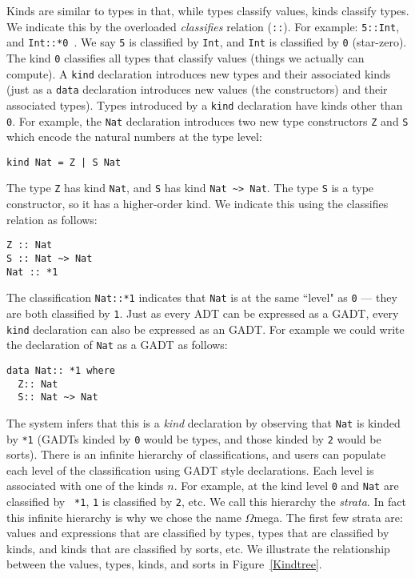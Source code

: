\documentclass[11pt,twoside]{article}
\newcommand{\om}{$\Omega$mega}
\begin{document}
Kinds are similar to types in that, while types classify values, kinds classify
types. We indicate this by the overloaded {\em classifies} relation ({\tt ::}). For example:
{\tt 5::Int}, and {\tt Int::*0 }. We say {\tt 5} is classified by {\tt Int}, and {\tt Int}
is classified by {\tt *0} (star-zero). The kind {\tt *0} classifies all
types that classify values (things we actually can compute). A {\tt kind}
declaration introduces new types and their associated kinds (just as a {\tt data}
declaration introduces new values (the constructors) and their associated types).
Types introduced by a {\tt kind} declaration have kinds other than {\tt *0}.
For example, the {\tt Nat} declaration introduces two new
type constructors {\tt Z} and {\tt S} which encode the natural
numbers at the type level:
\begin{verbatim}
kind Nat = Z | S Nat
\end{verbatim}
The type {\tt Z} has kind {\tt Nat}, and {\tt S} has kind {\tt Nat \verb+~+>
Nat}. The type {\tt S} is a type constructor, so it has a higher-order kind. We
indicate this using the classifies relation as follows:
\begin{verbatim}
Z :: Nat
S :: Nat ~> Nat
Nat :: *1
\end{verbatim}

The classification {\tt Nat::*1} indicates that {\tt Nat} is at the same
``level" as {\tt *0} --- they are both classified by {\tt *1}.
Just as every ADT can be expressed as a GADT, every {\tt kind}
declaration can also be expressed as an GADT. For example we could write
the declaration of {\tt Nat} as a GADT as follows:
\begin{verbatim}
data Nat:: *1 where
  Z:: Nat
  S:: Nat ~> Nat
\end{verbatim}

The system infers that this is a {\em kind} declaration by observing
that {\tt Nat} is kinded by \verb+*1+ (GADTs kinded by {\tt *0} would
be types, and those kinded by {\tt *2} would be sorts).
There is
an infinite hierarchy of classifications, and users
can populate each level of the classification using GADT style
declarations. Each level is associated with one of the kinds
{\tt *}$n$. For example, at the kind level {\tt *0} and {\tt Nat} are classified by {\tt
*1}, {\tt *1} is classified by {\tt *2}, etc.  We call this hierarchy
the {\em strata}. In fact this infinite hierarchy is why we chose the
name \om. The first few strata are: values and expressions that are
classified by types, types that are classified by kinds, and kinds that
are classified by sorts, etc. We illustrate
the relationship between the values, types, kinds, and sorts in
Figure~\ref{Kindtree}.
\end{document}
